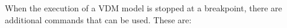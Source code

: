 \documentclass{overturerepchap}
\begin{document}






When the execution of a VDM model is stopped at a
breakpoint, there are additional commands that can be used. These are:
\end{document}
